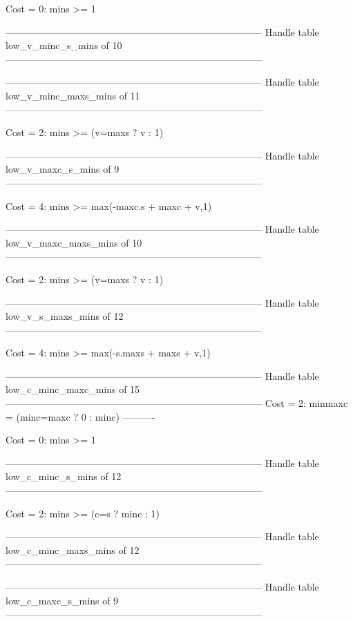 Cost =  0:  mins >= 1

--------------------------------------------------------------------------------
Handle table low_v_minc_s_mins of 10
--------------------------------------------------------------------------------


--------------------------------------------------------------------------------
Handle table low_v_minc_maxs_mins of 11
--------------------------------------------------------------------------------

Cost =  2:  mins >= (v=maxs ? v : 1)

--------------------------------------------------------------------------------
Handle table low_v_maxc_s_mins of 9
--------------------------------------------------------------------------------

Cost =  4:  mins >= max(-maxc.s + maxc + v,1)

--------------------------------------------------------------------------------
Handle table low_v_maxc_maxs_mins of 10
--------------------------------------------------------------------------------

Cost =  2:  mins >= (v=maxs ? v : 1)

--------------------------------------------------------------------------------
Handle table low_v_s_maxs_mins of 12
--------------------------------------------------------------------------------

Cost =  4:  mins >= max(-s.maxs + maxs + v,1)

--------------------------------------------------------------------------------
Handle table low_c_minc_maxc_mins of 15
--------------------------------------------------------------------------------
Cost =  2:  minmaxc = (minc=maxc ? 0 : minc)
----------

Cost =  0:  mins >= 1

--------------------------------------------------------------------------------
Handle table low_c_minc_s_mins of 12
--------------------------------------------------------------------------------

Cost =  2:  mins >= (c=s ? minc : 1)

--------------------------------------------------------------------------------
Handle table low_c_minc_maxs_mins of 12
--------------------------------------------------------------------------------


--------------------------------------------------------------------------------
Handle table low_c_maxc_s_mins of 9
--------------------------------------------------------------------------------

